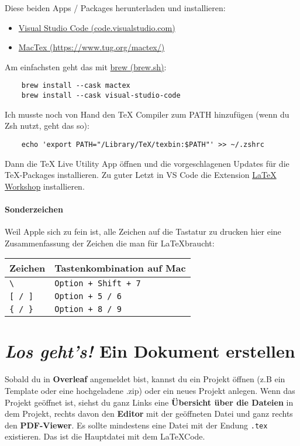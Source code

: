 \documentclass[titlepage]{article}
\newcommand{\sectionwithsubtitle}[2]{\section[\textit{#1} - #2]{\textit{#1} {\large #2}} \label{#2}}
\begin{document}
Diese beiden Apps / Packages herunterladen und installieren:
\begin{itemize}
    \item \href{https://code.visualstudio.com/}{Visual Studio Code (code.visualstudio.com)}
    \item \href{https://www.tug.org/mactex/}{MacTex (https://www.tug.org/mactex/)}
\end{itemize}
Am einfachsten geht das mit \href{https://brew.sh/}{brew (brew.sh)}:
\begin{lstlisting}
    brew install --cask mactex
    brew install --cask visual-studio-code
\end{lstlisting}
Ich musste noch von Hand den TeX Compiler zum PATH hinzufügen (wenn du Zsh nutzt, geht das so):
\begin{lstlisting}
    echo 'export PATH="/Library/TeX/texbin:$PATH"' >> ~/.zshrc
\end{lstlisting}
Dann die TeX Live Utility App öffnen und die vorgeschlagenen Updates für die TeX-Packages installieren. 
Zu guter Letzt in VS Code die Extension \href{https://open-vsx.org/extension/James-Yu/latex-workshop}{LaTeX Workshop} installieren.

\paragraph*{Sonderzeichen}
Weil Apple sich zu fein ist, alle Zeichen auf die Tastatur zu drucken hier eine Zusammenfassung der Zeichen die man für \LaTeX braucht:
\begin{table}[h!]
    \centering
    \begin{tabular}{|>{\raggedright\arraybackslash}p{2cm}|>{\raggedright\arraybackslash}p{8cm}|}
        \hline
        \textbf{Zeichen} & \textbf{Tastenkombination auf Mac} \\
        \hline
        \texttt{\textbackslash} & \texttt{Option + Shift + 7} \\
        \texttt{[ / ] } & \texttt{Option  + 5 / 6} \\
        \texttt{\{ / \}} & \texttt{Option + 8 / 9} \\
        \hline
    \end{tabular}
\end{table}



\sectionwithsubtitle{Los geht's!}{Ein Dokument erstellen}

Sobald du in \textbf{Overleaf} angemeldet bist, kannst du ein Projekt öffnen (z.B ein Template oder eine hochgeladene .zip) oder ein neues Projekt anlegen. 
Wenn das Projekt geöffnet ist, siehst du ganz Links eine \textbf{Übersicht über die Dateien} in dem Projekt, rechts davon den \textbf{Editor} mit der geöffneten Datei und ganz rechts den \textbf{PDF-Viewer}.
Es sollte mindestens eine Datei mit der Endung \verb|.tex| existieren. Das ist die Hauptdatei mit dem \LaTeX\-Code.
\end{document}
